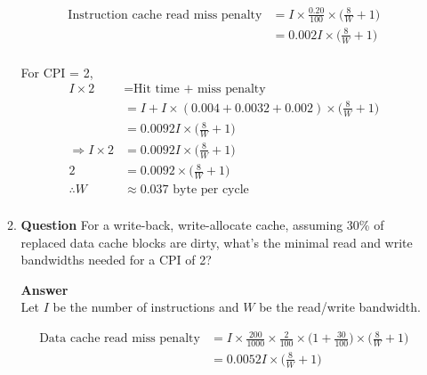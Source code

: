 \documentclass[10pt]{extarticle}
\begin{document}
\begin{enumerate}
\begin{enumerate}
            \begin{equation*}
                \begin{split}
                    \text{Instruction cache read miss penalty} &
                    = I \times \frac{0.20}{100} \times \bigg(\frac{8}{W} +
                    1\bigg) \\
                    & = 0.002I \times \bigg(\frac{8}{W} + 1\bigg) \\
                \end{split}
            \end{equation*}

            For CPI = 2,
            \begin{equation*}
                \begin{split}
                    I \times 2 & = \text{Hit time + miss penalty} \\
                    & = I + I \times (0.004 + 0.0032 + 0.002) \times
                    \bigg(\frac{8}{W} + 1\bigg) \\
                    & = 0.0092I \times \bigg(\frac{8}{W} + 1\bigg) \\
                   \Rightarrow I \times 2 & = 0.0092I \times \bigg(\frac{8}{W}
                   + 1\bigg) \\
                   2 & = 0.0092 \times \bigg(\frac{8}{W} + 1\bigg) \\
                   \therefore W & \approx 0.037 \text{ byte per cycle} \\
                \end{split}
            \end{equation*}

            \item \textbf{Question} For a write-back, write-allocate cache,
            assuming 30\% of replaced data cache blocks are dirty, what’s the
            minimal read and write bandwidths needed for a CPI of 2?

            \textbf{Answer} \\ Let $I$ be the number of instructions and $W$ be
            the read/write bandwidth.

            \begin{equation*}
                \begin{split}
                    \text{Data cache read miss penalty} &
                    = I \times \frac{200}{1000} \times \frac{2}{100} \times
                    \bigg( 1+\frac{30}{100} \bigg) \times \bigg( \frac{8}{W} +
                    1 \bigg) \\
                    & = 0.0052I \times \bigg(\frac{8}{W} + 1\bigg) \\
                \end{split}
            \end{equation*}


\end{enumerate}
\end{enumerate}
\end{document}
